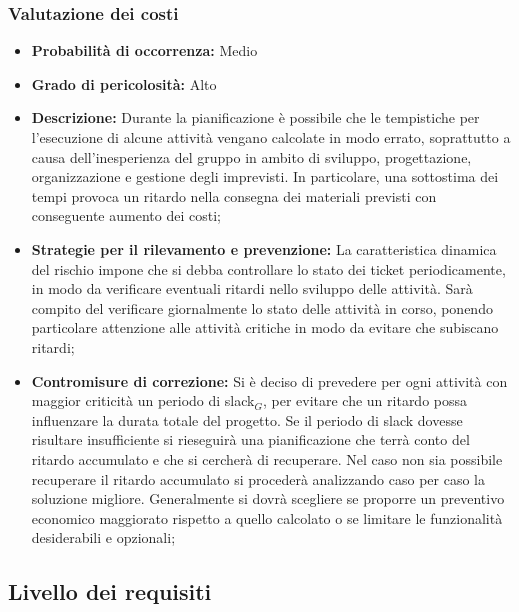 \subsubsection{Valutazione dei costi}
\hypertarget{subsubsect:costi}{}
\begin{itemize}
\item \textbf{Probabilità di occorrenza:} Medio
\item \textbf{Grado di pericolosità:} Alto
\item \textbf{Descrizione:} Durante la pianificazione è possibile che le tempistiche per l'esecuzione di alcune attività vengano calcolate in modo errato, soprattutto a causa dell'inesperienza del gruppo in ambito di sviluppo, progettazione, organizzazione e gestione degli imprevisti. In particolare, una sottostima dei tempi provoca un ritardo nella consegna dei materiali previsti con conseguente aumento dei costi;

\item \textbf{Strategie per il rilevamento e prevenzione:} La caratteristica dinamica del rischio impone che si debba controllare lo stato dei ticket periodicamente, in modo da verificare eventuali ritardi nello sviluppo delle attività. Sarà compito del \ruoloResponsabile{} verificare giornalmente lo stato delle attività in corso, ponendo particolare attenzione alle attività critiche in modo da evitare che subiscano ritardi;


\item \textbf{Contromisure di correzione:} Si è deciso di prevedere per ogni attività con maggior criticità un periodo di slack$_G$, per evitare che un ritardo possa influenzare la durata totale del progetto. Se il periodo di slack dovesse risultare insufficiente si rieseguirà una pianificazione che terrà conto del ritardo accumulato e che si cercherà di recuperare. Nel caso non sia possibile recuperare il ritardo accumulato si procederà analizzando caso per caso la soluzione migliore. Generalmente si dovrà scegliere se proporre un preventivo economico maggiorato rispetto a quello calcolato o se limitare le funzionalità desiderabili e opzionali;

\end{itemize}


\subsection{Livello dei requisiti}


